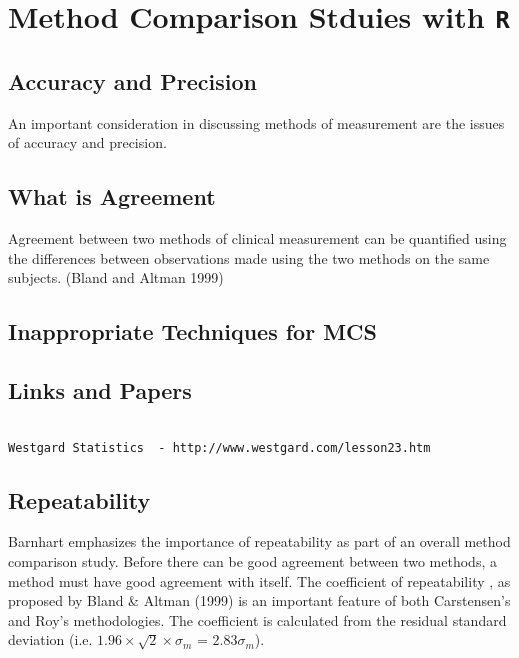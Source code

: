 \documentclass[]{article}
\begin{document}


\section{Method Comparison Stduies with \texttt{R}}

\subsection{Accuracy and Precision}

An important consideration in discussing methods of measurement are the issues of accuracy and precision.

\subsection{What is Agreement}

Agreement between two methods of clinical measurement can be quantified using the differences between observations made using the two methods on the same subjects. (Bland and Altman 1999)

\subsection{Inappropriate Techniques for MCS}


\subsection{Links and Papers}
\begin{verbatim}

Westgard Statistics  - http://www.westgard.com/lesson23.htm
\end{verbatim}



\newpage

\subsection{Repeatability}
Barnhart emphasizes the importance of repeatability as part of an overall method comparison study. Before there can be good agreement between two methods, a method must have good agreement with itself. The coefficient of repeatability , as proposed by Bland \& Altman (1999) is an important feature of both Carstensen's and Roy's methodologies. The coefficient is calculated from the residual standard deviation (i.e. $1.96 \times \sqrt{2} \times \sigma_m$ = $2.83 \sigma_m$).
\end{document}
